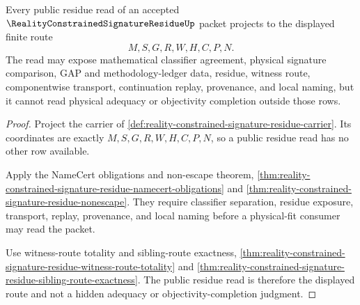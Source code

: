 \begin{theorem}
\label{thm:reality-constrained-signature-residue-carrier-row-readback}
Every public residue read of an accepted $\RealityConstrainedSignatureResidueUp$
packet projects to the displayed finite route
$$
M,S,G,R,W,H,C,P,N.
$$
The read may expose mathematical classifier agreement, physical signature
comparison, GAP and methodology-ledger data, residue, witness route,
componentwise transport, continuation replay, provenance, and local naming,
but it cannot read physical adequacy or objectivity completion outside those
rows.
\end{theorem}
\begin{proof}
Project the carrier of \autoref{def:reality-constrained-signature-residue-carrier}.
Its coordinates are exactly $M,S,G,R,W,H,C,P,N$, so a public residue read has no
other row available.

Apply the NameCert obligations and non-escape theorem,
\autoref{thm:reality-constrained-signature-residue-namecert-obligations} and
\autoref{thm:reality-constrained-signature-residue-nonescape}. They require
classifier separation, residue exposure, transport, replay, provenance, and
local naming before a physical-fit consumer may read the packet.

Use witness-route totality and sibling-route exactness,
\autoref{thm:reality-constrained-signature-residue-witness-route-totality} and
\autoref{thm:reality-constrained-signature-residue-sibling-route-exactness}. The
public residue read is therefore the displayed route and not a hidden adequacy
or objectivity-completion judgment.
\end{proof}

